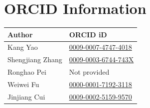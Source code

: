 \documentclass[11pt]{article}
\begin{document}
\section*{ORCID Information}

\renewcommand{\arraystretch}{1.35}
\begin{tabularx}{\textwidth}{@{}lX@{}}
\toprule
\textbf{Author} & \textbf{ORCID iD}\\
\midrule
Kang Yao &
\href{https://orcid.org/0009-0007-4747-4018}
{0009-0007-4747-4018}\\
Shengjiang Zhang &
\href{https://orcid.org/0009-0003-6744-743X}
{0009-0003-6744-743X}\\
Ronghao Pei & Not provided\\
Weiwei Fu &
\href{https://orcid.org/0000-0001-7192-3118}
{0000-0001-7192-3118}\\
Jinjiang Cui &
\href{https://orcid.org/0009-0002-5159-9570}
{0009-0002-5159-9570}\\
\bottomrule
\end{tabularx}
\end{document}
